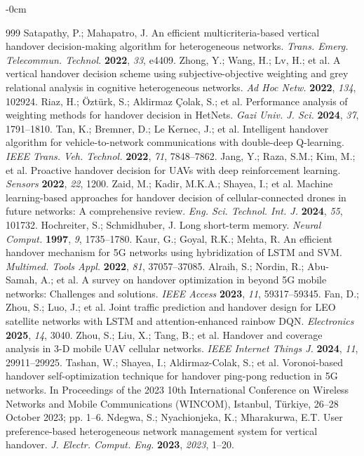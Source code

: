 \documentclass[remotesensing,article,submit,moreauthors]{Definitions/mdpi}
\begin{document}
\begin{adjustwidth}{-\extralength}{0cm}
\begin{thebibliography}{999}
Satapathy, P.; Mahapatro, J. An efficient multicriteria-based vertical handover decision-making algorithm for heterogeneous networks. {\em Trans. Emerg. Telecommun. Technol.} {\bf 2022}, {\em 33}, e4409.
Zhong, Y.; Wang, H.; Lv, H.; et al. A vertical handover decision scheme using subjective-objective weighting and grey relational analysis in cognitive heterogeneous networks. {\em Ad Hoc Netw.} {\bf 2022}, {\em 134}, 102924.
Riaz, H.; Öztürk, S.; Aldirmaz Çolak, S.; et al. Performance analysis of weighting methods for handover decision in HetNets. {\em Gazi Univ. J. Sci.} {\bf 2024}, {\em 37}, 1791--1810.
Tan, K.; Bremner, D.; Le Kernec, J.; et al. Intelligent handover algorithm for vehicle-to-network communications with double-deep Q-learning. {\em IEEE Trans. Veh. Technol.} {\bf 2022}, {\em 71}, 7848--7862.
Jang, Y.; Raza, S.M.; Kim, M.; et al. Proactive handover decision for UAVs with deep reinforcement learning. {\em Sensors} {\bf 2022}, {\em 22}, 1200.
Zaid, M.; Kadir, M.K.A.; Shayea, I.; et al. Machine learning-based approaches for handover decision of cellular-connected drones in future networks: A comprehensive review. {\em Eng. Sci. Technol. Int. J.} {\bf 2024}, {\em 55}, 101732.
Hochreiter, S.; Schmidhuber, J. Long short-term memory. {\em Neural Comput.} {\bf 1997}, {\em 9}, 1735--1780.
Kaur, G.; Goyal, R.K.; Mehta, R. An efficient handover mechanism for 5G networks using hybridization of LSTM and SVM. {\em Multimed. Tools Appl.} {\bf 2022}, {\em 81}, 37057--37085.
Alraih, S.; Nordin, R.; Abu-Samah, A.; et al. A survey on handover optimization in beyond 5G mobile networks: Challenges and solutions. {\em IEEE Access} {\bf 2023}, {\em 11}, 59317--59345.
Fan, D.; Zhou, S.; Luo, J.; et al. Joint traffic prediction and handover design for LEO satellite networks with LSTM and attention-enhanced rainbow DQN. {\em Electronics} {\bf 2025}, {\em 14}, 3040.
Zhou, S.; Liu, X.; Tang, B.; et al. Handover and coverage analysis in 3-D mobile UAV cellular networks. {\em IEEE Internet Things J.} {\bf 2024}, {\em 11}, 29911--29925.
Tashan, W.; Shayea, I.; Aldirmaz-Colak, S.; et al. Voronoi-based handover self-optimization technique for handover ping-pong reduction in 5G networks. In Proceedings of the 2023 10th International Conference on Wireless Networks and Mobile Communications (WINCOM), Istanbul, Türkiye, 26--28 October 2023; pp. 1--6.
Ndegwa, S.; Nyachionjeka, K.; Mharakurwa, E.T. User preference-based heterogeneous network management system for vertical handover. {\em J. Electr. Comput. Eng.} {\bf 2023}, {\em 2023}, 1--20.

\end{thebibliography}
\end{adjustwidth}
\end{document}
